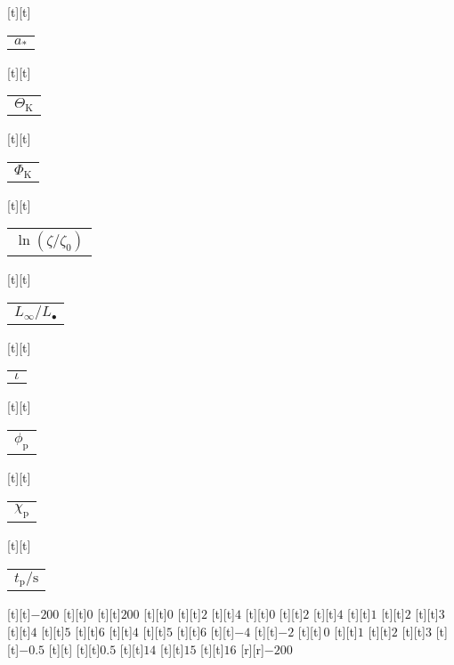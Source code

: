 \begin{psfrags}
[t][t]{\color[rgb]{0,0,0}\setlength{\tabcolsep}{0pt}\begin{tabular}{c}{$a_\ast$}\end{tabular}}%
[t][t]{\color[rgb]{0,0,0}\setlength{\tabcolsep}{0pt}\begin{tabular}{c}{$\Theta_\mathrm{K}$}\end{tabular}}%
[t][t]{\color[rgb]{0,0,0}\setlength{\tabcolsep}{0pt}\begin{tabular}{c}{$\Phi_\mathrm{K}$}\end{tabular}}%
[t][t]{\color[rgb]{0,0,0}\setlength{\tabcolsep}{0pt}\begin{tabular}{c}{$\ln(\zeta/\zeta_0)$}\end{tabular}}%
[t][t]{\color[rgb]{0,0,0}\setlength{\tabcolsep}{0pt}\begin{tabular}{c}{$L_\infty/L_\bullet$}\end{tabular}}%
[t][t]{\color[rgb]{0,0,0}\setlength{\tabcolsep}{0pt}\begin{tabular}{c}{$\iota$}\end{tabular}}%
[t][t]{\color[rgb]{0,0,0}\setlength{\tabcolsep}{0pt}\begin{tabular}{c}{$\phi_\mathrm{p}$}\end{tabular}}%
[t][t]{\color[rgb]{0,0,0}\setlength{\tabcolsep}{0pt}\begin{tabular}{c}{$\chi_\mathrm{p}$}\end{tabular}}%
[t][t]{\color[rgb]{0,0,0}\setlength{\tabcolsep}{0pt}\begin{tabular}{c}{$t_\mathrm{p}/\mathrm{s}$}\end{tabular}}%
%
[t][t]{$-200$}%
[t][t]{$0$}%
[t][t]{$200$}%
[t][t]{$0$}%
[t][t]{$2$}%
[t][t]{$4$}%
[t][t]{$0$}%
[t][t]{$2$}%
[t][t]{$4$}%
[t][t]{$1$}%
[t][t]{$2$}%
[t][t]{$3$}%
[t][t]{$4$}%
[t][t]{$5$}%
[t][t]{$6$}%
[t][t]{$4$}%
[t][t]{$5$}%
[t][t]{$6$}%
[t][t]{$-4$}%
[t][t]{$-2$}%
[t][t]{$\,0$}%
[t][t]{$1$}%
[t][t]{$2$}%
[t][t]{$3$}%
[t][t]{$-0.5$}%
[t][t]{}%
[t][t]{$0.5$}%
[t][t]{$14$}%
[t][t]{$15$}%
[t][t]{$16$}%
%
[r][r]{$-200\!$}%

\end{psfrags}
